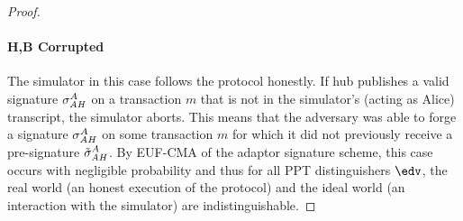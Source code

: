 \begin{proof}
\paragraph{H,B Corrupted} The simulator in this case follows the protocol honestly. If hub publishes a valid signature $\sigma_{\mathit{AH}}^A$ on a transaction $m$ that is not in the simulator's (acting as Alice) transcript, the simulator aborts. This means that the adversary was able to forge a signature $\sigma_{\mathit{AH}}^A$ on some transaction $m$ for which it did not previously receive a pre-signature $\tilde{\sigma}_{\mathit{AH}}^A$. By EUF-CMA of the adaptor signature scheme, this case occurs with negligible probability and thus for all PPT distinguishers $\env$, the real world (an honest execution of the protocol) and the ideal world (an interaction with the simulator) are indistinguishable.
\end{proof}